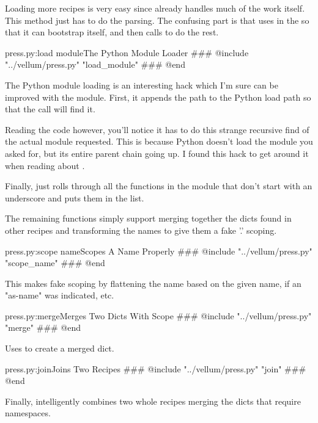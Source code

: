 Loading more recipes is very easy since  already handles much of
the work itself.  This method just has to do the parsing.  The confusing part is
that  uses  in the  so that it
can bootstrap itself, and then calls  to do the rest.

\begin{code}{press.py:load module}{The Python Module Loader}
### @include "../vellum/press.py" "load_module"
### @end
\end{code}

The Python module loading is an interesting hack which I'm sure can be improved
with the  module.  First, it appends the 
path to the Python load path so that the  call will find it.

Reading the code however, you'll notice it has to do this strange recursive find
of the actual module requested.  This is because Python doesn't load the module
you asked for, but its entire parent chain going up.  I found this hack to get
around it when reading about .

Finally,  just rolls through all the functions in the module
that don't start with an underscore and puts them in the  list.

The remaining functions simply support merging together the dicts found in
other recipes and transforming the names to give them a fake '.' scoping.

\begin{code}{press.py:scope name}{Scopes A Name Properly}
### @include "../vellum/press.py" "scope_name"
### @end
\end{code}

This makes fake scoping by flattening the name based on the given name, if an
"as-name" was indicated, etc.

\begin{code}{press.py:merge}{Merges Two Dicts With Scope}
### @include "../vellum/press.py" "merge"
### @end
\end{code}

Uses  to create a merged dict.

\begin{code}{press.py:join}{Joins Two Recipes}
### @include "../vellum/press.py" "join"
### @end
\end{code}

Finally,  intelligently combines two whole recipes merging the dicts
that require namespaces.





